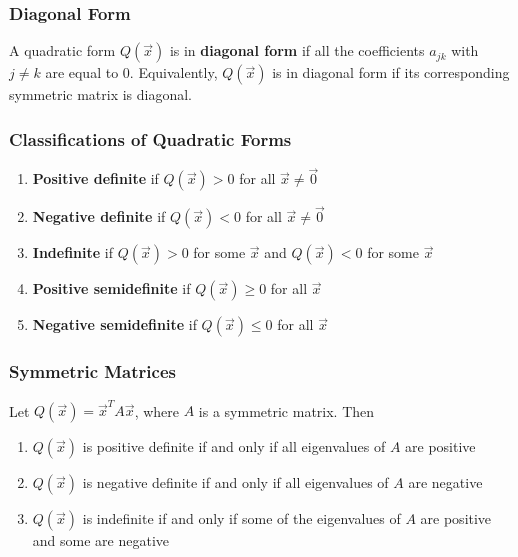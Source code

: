 \documentclass[a4paper,9pt]{extarticle}
\begin{document}
\begin{multicols*}{2}
\subsubsection{Diagonal Form}
A quadratic form $Q(\vec{x})$ is in \textbf{diagonal form} if all the coefficients $a_{jk}$ with $j \neq k$ are equal to $0$. Equivalently, $Q(\vec{x})$ is in diagonal form if its corresponding symmetric matrix is diagonal.


\subsubsection{Classifications of Quadratic Forms}
\begin{enumerate}[label=\bfseries \arabic*.] \itemsep0pt \parskip0pt
    \item \textbf{Positive definite} if $Q(\vec{x}) > 0$ for all $\vec{x} \neq \vec{0}$
    \item \textbf{Negative definite} if $Q(\vec{x}) < 0$ for all $\vec{x} \neq \vec{0}$
    \item \textbf{Indefinite} if $Q(\vec{x}) > 0$ for some $\vec{x}$ and $Q(\vec{x}) < 0$ for some $\vec{x}$
    \item \textbf{Positive semidefinite} if $Q(\vec{x}) \geq 0$ for all $\vec{x}$
    \item \textbf{Negative semidefinite} if $Q(\vec{x}) \leq 0$ for all $\vec{x}$
\end{enumerate}


\subsubsection{Symmetric Matrices}
Let $Q(\vec{x}) = \vec{x}^T A \vec{x}$, where $A$ is a symmetric matrix. Then
\begin{enumerate}[label=\bfseries \arabic*.] \itemsep0pt \parskip0pt
    \item $Q(\vec{x})$ is positive definite if and only if all eigenvalues of $A$ are positive
    \item $Q(\vec{x})$ is negative definite if and only if all eigenvalues of $A$ are negative
    \item $Q(\vec{x})$ is indefinite if and only if some of the eigenvalues of $A$ are positive and some are negative
\end{enumerate}



\end{multicols*}
\end{document}
